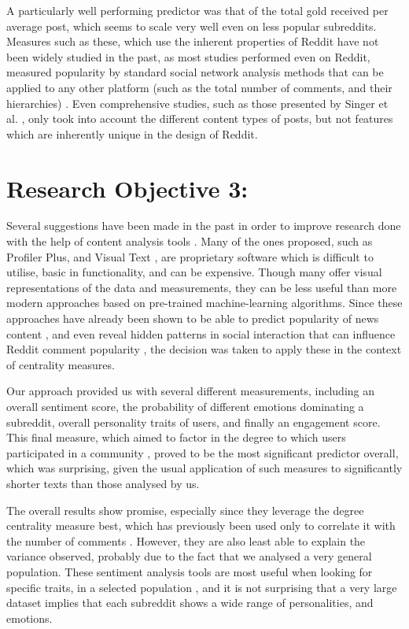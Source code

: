 \documentclass[bsc,frontabs,twoside,singlespacing,parskip,deptreport]{infthesis}
\begin{document}
A particularly well performing predictor was that of the total gold received per average post, which seems to scale very well even on less popular subreddits. Measures such as these, which use the inherent properties of Reddit have not been widely studied in the past, as most studies performed even on Reddit, measured popularity by standard social network analysis methods that can be applied to any other platform (such as the total number of comments, and their hierarchies) \cite{weninger} \cite{steinbauer}. Even comprehensive studies, such as those presented by Singer et al. \cite{singer}, only took into account the different content types of posts, but not features which are inherently unique in the design of Reddit.  

\section{Research Objective 3:}\label{rq3}

Several suggestions have been made in the past in order to improve research done with the help of content analysis tools \cite{lowe2002software}. Many of the ones proposed, such as Profiler Plus, and Visual Text \cite{masters} \cite{lowe2002software}, are proprietary software which is difficult to utilise, basic in functionality, and can be expensive. Though many offer visual representations of the data and measurements, they can be less useful than more modern approaches based on pre-trained machine-learning algorithms. Since these approaches have already been shown to be able to predict popularity of news content \cite{sentiment14}, and even reveal hidden patterns in social interaction that can influence Reddit comment popularity \cite{sentiment3}, the decision was taken to apply these in the context of centrality measures. 

Our approach provided us with several different measurements, including an overall sentiment score, the probability of different emotions dominating a subreddit, overall personality traits of users, and finally an engagement score. This final measure, which aimed to factor in the degree to which users participated in a community \cite{sentiment8}, proved to be the most significant predictor overall, which was surprising, given the usual application of such measures to significantly shorter texts than those analysed by us. 

The overall results show promise, especially since they leverage the degree centrality measure best, which has previously been used only to correlate it with the number of comments \cite{steinbauer}. However, they are also least able to explain the variance observed, probably due to the fact that we analysed a very general population. These sentiment analysis tools are most useful when looking for specific traits, in a selected population \cite{sentiment7}, and it is not surprising that a very large dataset implies that each subreddit shows a wide range of personalities, and emotions. 
\end{document}
